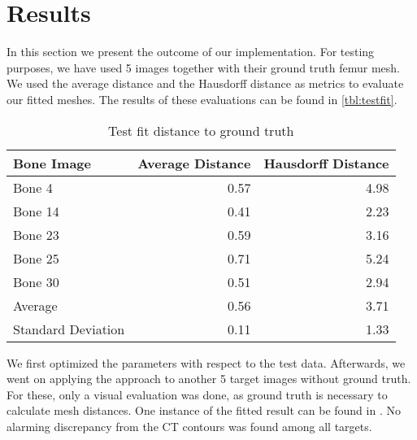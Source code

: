 \section{Results}
\label{sec:results}

In this section we present the outcome of our implementation.
For testing purposes, we have used 5 images together with their ground truth femur mesh.
We used the average distance and the Hausdorff distance as metrics to evaluate our fitted meshes.
The results of these evaluations can be found in \autoref{tbl:testfit}.

\begin{table}
  \centering
  \caption{Test fit distance to ground truth}
  \label{tbl:testfit}
  \begin{tabular}{lrr}
    \toprule
      \textbf{Bone Image} &
      Average Distance &
       Hausdorff Distance \\
    \midrule
      Bone 4 & 0.57 & 4.98 \\
      Bone 14 & 0.41 & 2.23 \\
      Bone 23 & 0.59 & 3.16 \\
      Bone 25 & 0.71 & 5.24 \\
      Bone 30 & 0.51 & 2.94 \\
    \midrule
      Average & 0.56 & 3.71 \\
      Standard Deviation & 0.11 & 1.33 \\
    \bottomrule
  \end{tabular}
\end{table}

We first optimized the parameters with respect to the test data.
Afterwards, we went on applying the approach to another 5 target images without ground truth.
For these, only a visual evaluation was done, as ground truth is necessary to calculate mesh distances.
One instance of the fitted result can be found in .
No alarming discrepancy from the CT contours was found among all targets.
